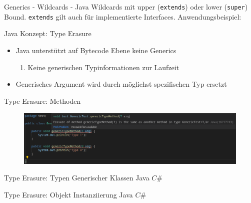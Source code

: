 \documentclass[11pt]{beamer}
\begin{document}
\begin{frame}{Generics - Wildcards - Java}
		Wildcards mit upper (\texttt{extends}) oder lower (\texttt{super}) Bound. \texttt{extends} gilt auch für implementierte Interfaces.
		Anwendungsbeispiel:
\end{frame}


\begin{frame}{Java Konzept: Type Erasure}
	\begin{itemize}
	\item Java unterstützt auf Bytecode Ebene keine Generics
	\begin{enumerate}
		\item Keine generischen Typinformationen zur Laufzeit
	\end{enumerate}
	\item Generisches Argument wird durch möglichst spezifischen Typ ersetzt
	\end{itemize}
\end{frame}





\begin{frame}{Type Erasure: Methoden}
	\begin{figure}
		\includegraphics[width=\textwidth]{bilder/java_type_erasure.png}
	\end{figure}
\end{frame}

\begin{frame}{Type Erasure: Typen Generischer Klassen}
	Java
	$C\#$
\end{frame}

\begin{frame}{Type Erasure: Objekt Instanziierung}
	Java
	$C\#$
\end{frame}
\end{document}
